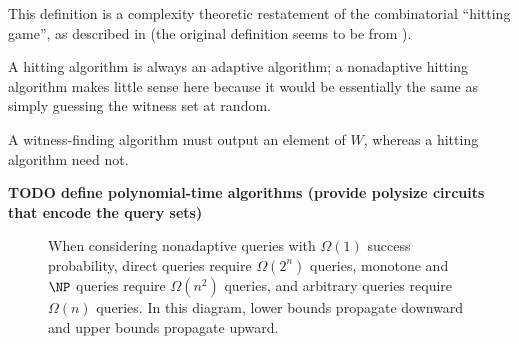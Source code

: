 \documentclass{article}
\newcommand{\todo}[1]{\textbf{TODO #1}}
\begin{document}
This definition is a complexity theoretic restatement of the combinatorial ``hitting game'', as described in \autocite[Section~3]{newport14} (the original definition seems to be from \autocite[Definition~5]{bgi92}).

A hitting algorithm is always an adaptive algorithm; a nonadaptive hitting algorithm makes little sense here because it would be essentially the same as simply guessing the witness set at random.

A witness-finding algorithm must output an element of $W$, whereas a hitting algorithm need not.

\todo{define polynomial-time algorithms (provide polysize circuits that encode the query sets)}

\begin{figure}
  \caption{\label{fig:queries}%
    When considering nonadaptive queries with $\Omega(1)$ success probability, direct queries require $\Omega(2^n)$ queries, monotone and $\NP$ queries require $\Omega(n^2)$ queries, and arbitrary queries require $\Omega(n)$ queries.
    In this diagram, lower bounds propagate downward and upper bounds propagate upward.%
  }
  \begin{center}
  \end{center}
\end{figure}
\end{document}
